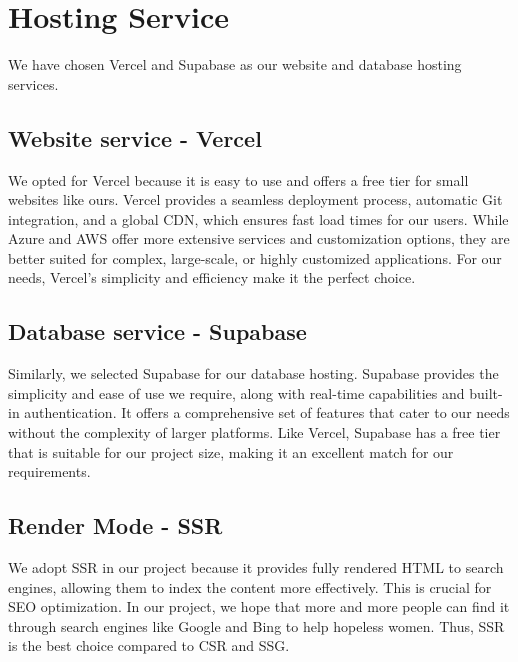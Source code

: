 \section{Hosting Service}
We have chosen Vercel and Supabase as our website and database hosting services.

\subsection{Website service - Vercel}
We opted for Vercel because it is easy to use and offers a free tier for small websites like ours. Vercel provides a seamless deployment process, automatic Git integration, and a global CDN, which ensures fast load times for our users. While Azure and AWS offer more extensive services and customization options, they are better suited for complex, large-scale, or highly customized applications. For our needs, Vercel's simplicity and efficiency make it the perfect choice.

\subsection{Database service - Supabase}
Similarly, we selected Supabase for our database hosting. Supabase provides the simplicity and ease of use we require, along with real-time capabilities and built-in authentication. It offers a comprehensive set of features that cater to our needs without the complexity of larger platforms. Like Vercel, Supabase has a free tier that is suitable for our project size, making it an excellent match for our requirements.

\subsection{Render Mode - SSR }
We adopt SSR in our project because it provides fully rendered HTML to search engines, allowing them to index the content more effectively. This is crucial for SEO optimization. In our project, we hope that more and more people can find it through search engines like Google and Bing to help hopeless women. Thus, SSR is the best choice compared to CSR and SSG.